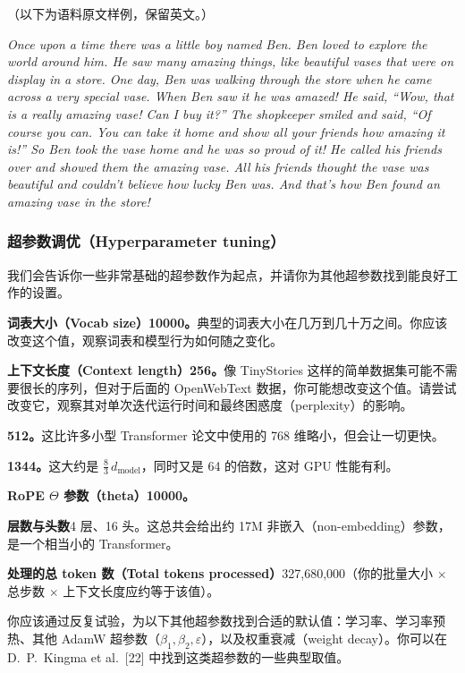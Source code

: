 （以下为语料原文样例，保留英文。）

\textit{Once upon a time there was a little boy named Ben. Ben loved to explore the world around him. He saw many amazing things, like beautiful vases that were on display in a store. One day, Ben was walking through the store when he came across a very special vase. When Ben saw it he was amazed! He said, ``Wow, that is a really amazing vase! Can I buy it?'' The shopkeeper smiled and said, ``Of course you can. You can take it home and show all your friends how amazing it is!'' So Ben took the vase home and he was so proud of it! He called his friends over and showed them the amazing vase. All his friends thought the vase was beautiful and couldn't believe how lucky Ben was. And that's how Ben found an amazing vase in the store!}

\subsubsection{超参数调优（Hyperparameter tuning）}

我们会告诉你一些非常基础的超参数作为起点，并请你为其他超参数找到能良好工作的设置。

\textbf{词表大小（Vocab size）10000。}典型的词表大小在几万到几十万之间。你应该改变这个值，观察词表和模型行为如何随之变化。

\textbf{上下文长度（Context length）256。}像 TinyStories 这样的简单数据集可能不需要很长的序列，但对于后面的 OpenWebText 数据，你可能想改变这个值。请尝试改变它，观察其对单次迭代运行时间和最终困惑度（perplexity）的影响。

\textbf{ 512。}这比许多小型 Transformer 论文中使用的 768 维略小，但会让一切更快。

\textbf{ 1344。}这大约是 $\tfrac{8}{3}\,d_{\mathrm{model}}$，同时又是 64 的倍数，这对 GPU 性能有利。

\textbf{RoPE $\Theta$ 参数（theta）10000。}

\textbf{层数与头数}4 层、16 头。这总共会给出约 17M 非嵌入（non-embedding）参数，是一个相当小的 Transformer。

\textbf{处理的总 token 数（Total tokens processed）}327,680,000（你的批量大小 $\times$ 总步数 $\times$ 上下文长度应约等于该值）。

你应该通过反复试验，为以下其他超参数找到合适的默认值：学习率、学习率预热、其他 AdamW 超参数（$\beta_1, \beta_2, \varepsilon$），以及权重衰减（weight decay）。你可以在 D.~P.~Kingma et al.~[22] 中找到这类超参数的一些典型取值。

